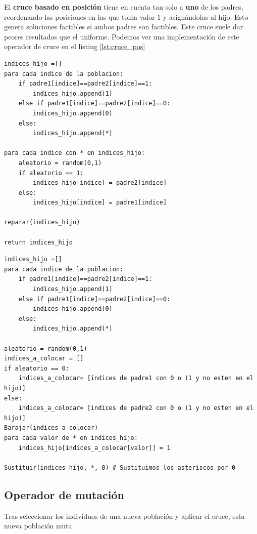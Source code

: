 El \textbf{cruce basado en posición} tiene en cuenta tan solo a \textbf{uno} de los padres, reordenando las posiciones en las que toma valor $1$ y asignándolas al hijo.
Esto genera soluciones factibles si ambos padres son factibles. Este cruce suele dar peores resultados que el uniforme. Podemos ver una implementación de este operador de cruce en el listing \ref{lst:cruce_pos}

\begin{lstlisting}[frame=single, caption={Cruce uniforme}, captionpos=b, label=lst:cruce_unif]
indices_hijo =[]
para cada indice de la poblacion:
    if padre1[indice]==padre2[indice]==1:
        indices_hijo.append(1)
    else if padre1[indice]==padre2[indice]==0:
        indices_hijo.append(0)
    else:
        indices_hijo.append(*)

para cada indice con * en indices_hijo:
    aleatorio = random(0,1)
    if aleatorio == 1:
        indices_hijo[indice] = padre2[indice]
    else:
        indices_hijo[indice] = padre1[indice]

reparar(indices_hijo)

return indices_hijo
\end{lstlisting}

\begin{lstlisting}[frame=single, caption={Cruce basado en posición}, captionpos=b, label=lst:cruce_pos]
indices_hijo =[]
para cada indice de la poblacion:
    if padre1[indice]==padre2[indice]==1:
        indices_hijo.append(1)
    else if padre1[indice]==padre2[indice]==0:
        indices_hijo.append(0)
    else:
        indices_hijo.append(*)
        
aleatorio = random(0,1)
indices_a_colocar = []
if aleatorio == 0:
    indices_a_colocar= [indices de padre1 con 0 o (1 y no esten en el hijo)]
else:
    indices_a_colocar= [indices de padre2 con 0 o (1 y no esten en el hijo)]      
Barajar(indices_a_colocar)
para cada valor de * en indices_hijo:
    indices_hijo[indices_a_colocar[valor]] = 1
    
Sustituir(indices_hijo, *, 0) # Sustituimos los asteriscos por 0

\end{lstlisting}

\subsection{Operador de mutación}

Tras seleccionar los individuos de una nueva población y aplicar el cruce, esta nueva población muta.

